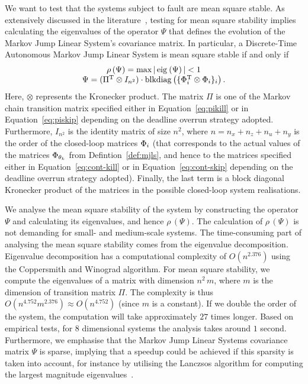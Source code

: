 We want to test that the systems subject to fault are mean square stable.
As extensively discussed in the literature~\cite{Costa:2005}, testing for mean square stability implies calculating the eigenvalues of the operator $\Psi$ that defines the evolution of the Markov Jump Linear System's covariance matrix.
In particular, a Discrete-Time Autonomous Markov Jump Linear System is mean square stable if and only if 
\begin{equation}%
    \label{eq:stab-notion}%
    \begin{matrix}
        \rho\,(\Psi) = \max{\abs{\,\eig{}{\Psi}\,}} < 1 \\
        \Psi = (\Pi^\T \otimes I_{n^2}) \cdot \blkdiag{\{ \clmat_{i}^\T \otimes \clmat_{i} \}_{i}}.
    \end{matrix}
\end{equation}
Here, $\otimes$ represents the Kronecker product.
The matrix $\Pi$ is one of the Markov chain transition matrix specified either in Equation~\eqref{eq:pikill} or in Equation~\eqref{eq:piskip} depending on the deadline overrun strategy adopted.
Furthermore, $I_{n^2}$ is the identity matrix of size $n^2$, where $n = n_x + n_z + n_u + n_y$ is the order of the closed-loop matrices $\Phi_{i}$ (that corresponds to the actual values of the matrices $\Phi_{\theta_k}$ from Defintion~\ref{def:mjls}, and hence to the matrices specified either in Equation~\eqref{eq:cont-kill} or in Equation~\eqref{eq:cont-skip} depending on the deadline overrun strategy adopted).
Finally, the last term is a block diagonal Kronecker product of the matrices in the possible closed-loop system realisations.

We analyse the mean square stability of the system by constructing the operator $\Psi$ and calculating its eigenvalues, and hence $\rho\,(\Psi)$.
The calculation of $\rho\,(\Psi)$ is not demanding for small- and medium-scale systems.
The time-consuming part of analysing the mean square stability comes from the eigenvalue decomposition.
Eigenvalue decomposition has a computational complexity of 
$O(n^{2.376})$ using the Coppersmith and Winograd algorithm.
For mean square stability, we compute the eigenvalues of a matrix with dimension $n^2\,m$, where $m$ is the dimension of transition matrix $\Pi$.
The complexity is thus $O(n^{4.752}m^{2.376}) \approx O(n^{4.752})$ (since $m$ is a constant).
If we double the order of the system, the computation will take approximately $27$ times longer.
Based on empirical tests, for $8$ dimensional systems the analysis takes around $1$ second.
Furthermore, we emphasise that the Markov Jump Linear Systems covariance matrix $\Psi$ is sparse, implying that a speedup could be achieved if this sparsity is taken into account, for instance by utilising the Lanczsos algorithm for computing the largest magnitude eigenvalues~\cite{Golub:1996}.
